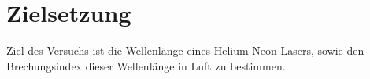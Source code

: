 
\section{Zielsetzung}
\label{sec:Zielsetzung}

Ziel des Versuchs ist die Wellenlänge eines Helium-Neon-Lasers, sowie den Brechungsindex dieser Wellenlänge in Luft zu bestimmen.